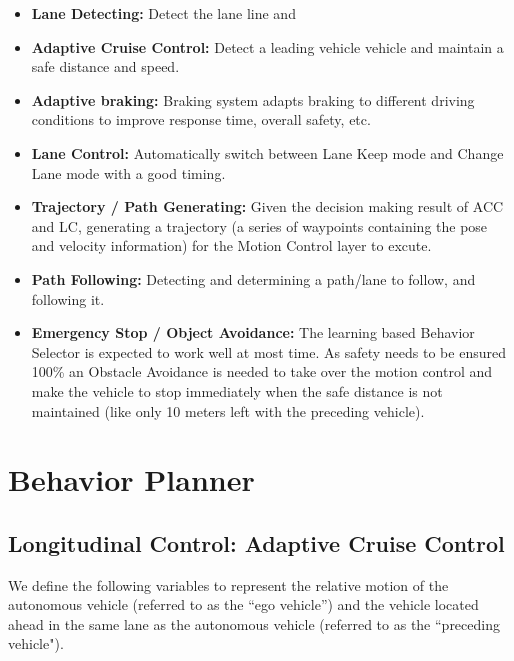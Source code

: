 \begin{itemize}
\item \textbf {Lane Detecting:} Detect the lane line and 
\item \textbf{Adaptive Cruise Control:} Detect a leading vehicle vehicle and maintain a safe distance and speed.
\item \textbf{Adaptive braking:} Braking system adapts braking to different driving conditions to improve response time, overall safety, etc.
\item \textbf{Lane Control:} Automatically switch between Lane Keep mode and Change Lane mode with a good timing.
\item \textbf{Trajectory / Path Generating:} Given the decision making result of ACC and LC, generating a trajectory (a series of waypoints containing the pose and velocity information) for the Motion Control layer to excute.
\item \textbf{Path Following:} Detecting and determining a path/lane to follow, and following it.
\item \textbf{Emergency Stop / Object Avoidance:} The learning based Behavior Selector is expected to work well at most time. As safety needs to be ensured 100\% an Obstacle Avoidance is needed to take over the motion control and make the vehicle to stop immediately when the safe distance is not maintained (like only 10 meters left with the preceding vehicle).
\end{itemize}

\section{Behavior Planner}

\subsection{Longitudinal Control:  Adaptive Cruise Control}

We define the following variables to represent the relative motion of the autonomous vehicle (referred to as the ``ego vehicle'') and the vehicle located ahead in the same lane as the autonomous vehicle (referred to as the ``preceding vehicle").

